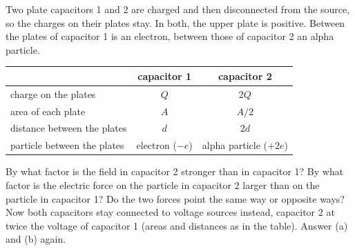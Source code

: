 Two plate capacitors 1 and 2 are charged and then disconnected from the source, so the charges on their plates stay. In both, the upper plate is positive. Between the plates of capacitor 1 is an electron, between those of capacitor 2 an alpha particle.

\begin{center}
\begin{tabular}{lcc}
 & capacitor 1 & capacitor 2 \\ \hline
charge on the plates & $Q$ & $2Q$ \\
area of each plate & $A$ & $A/2$ \\
distance between the plates & $d$ & $2d$ \\
particle between the plates & electron ($-e$) & alpha particle ($+2e$)
\end{tabular}
\end{center}

\begin{abcliste}
\abc By what factor is the field in capacitor 2 stronger than in capacitor 1?
\abc By what factor is the electric force on the particle in capacitor 2 larger than on the particle in capacitor 1?
\abc Do the two forces point the same way or opposite ways?
\abc Now both capacitors stay connected to voltage sources instead, capacitor 2 at twice the voltage of capacitor 1 (areas and distances as in the table). Answer (a) and (b) again.
\end{abcliste}
